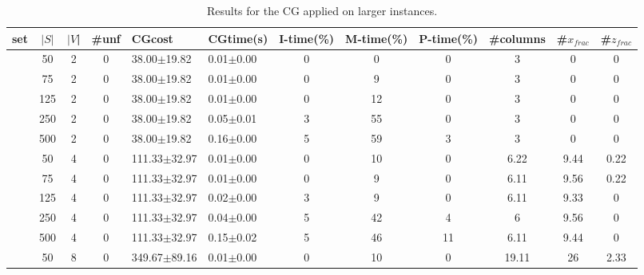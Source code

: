 \documentclass[12pt]{article}
\begin{document}
\begin{table}[h]
\begin{center}
\scriptsize
  \caption{Results for the CG applied on larger instances. \label{tab:full}}
  \begin{tabular}{c c c c l l c c c c c c}
set & $|S|$ & $|V$| & \#unf  & CGcost  &  CGtime(s)  &  I-time(\%)  &  M-time(\%) & P-time(\%)  &  \#columns  &  \#$x_{frac}$  &  \#$z_{frac}$ \\

\hline
 &50      &  2   &    0  &  38.00$\pm$19.82     &        0.01$\pm$0.00  &  0  &          0   &            0   &         3       &       0       &  0       \\
 &75      &  2   &    0  &  38.00$\pm$19.82     &        0.01$\pm$0.00  &  0  &          9   &            0   &         3       &       0       &  0       \\
 &125     &  2   &    0  &  38.00$\pm$19.82     &        0.01$\pm$0.00  &  0  &          12  &            0   &         3       &       0       &  0       \\
 &250     &  2   &    0  &  38.00$\pm$19.82     &        0.05$\pm$0.01  &  3  &          55  &            0   &         3       &       0       &  0       \\
 &500     &  2   &    0  &  38.00$\pm$19.82     &        0.16$\pm$0.00  &  5  &          59  &            3   &         3       &       0       &  0       \\
 &50      &  4   &    0  &  111.33$\pm$32.97    &        0.01$\pm$0.00  &  0  &          10  &            0   &         6.22    &       9.44    &  0.22    \\
 &75      &  4   &    0  &  111.33$\pm$32.97    &        0.01$\pm$0.00  &  0  &          9   &            0   &         6.11    &       9.56    &  0.22    \\
 &125     &  4   &    0  &  111.33$\pm$32.97    &        0.02$\pm$0.00  &  3  &          9   &            0   &         6.11    &       9.33    &  0       \\
 &250     &  4   &    0  &  111.33$\pm$32.97    &        0.04$\pm$0.00  &  5  &          42  &            4   &         6       &       9.56    &  0       \\
 &500     &  4   &    0  &  111.33$\pm$32.97    &        0.15$\pm$0.02  &  5  &          46  &            11  &         6.11    &       9.44    &  0       \\
 &50      &  8   &    0  &  349.67$\pm$89.16    &        0.01$\pm$0.00  &  0  &          10  &            0   &         19.11   &       26      &  2.33    \\

\end{tabular}
\end{center}
\end{table}
\end{document}
